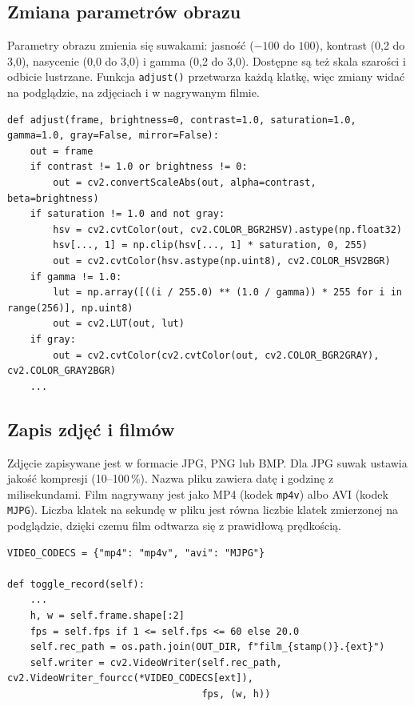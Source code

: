 \subsection{Zmiana parametrów obrazu}
Parametry obrazu zmienia się suwakami: jasność ($-100$ do $100$), kontrast (0,2 do 3,0),
nasycenie (0,0 do 3,0) i gamma (0,2 do 3,0). Dostępne są też skala szarości i odbicie lustrzane.
Funkcja \texttt{adjust()} przetwarza każdą klatkę, więc zmiany widać na podglądzie, na zdjęciach
i w nagrywanym filmie.
\begin{lstlisting}
def adjust(frame, brightness=0, contrast=1.0, saturation=1.0, gamma=1.0, gray=False, mirror=False):
    out = frame
    if contrast != 1.0 or brightness != 0:
        out = cv2.convertScaleAbs(out, alpha=contrast, beta=brightness)
    if saturation != 1.0 and not gray:
        hsv = cv2.cvtColor(out, cv2.COLOR_BGR2HSV).astype(np.float32)
        hsv[..., 1] = np.clip(hsv[..., 1] * saturation, 0, 255)
        out = cv2.cvtColor(hsv.astype(np.uint8), cv2.COLOR_HSV2BGR)
    if gamma != 1.0:
        lut = np.array([((i / 255.0) ** (1.0 / gamma)) * 255 for i in range(256)], np.uint8)
        out = cv2.LUT(out, lut)
    if gray:
        out = cv2.cvtColor(cv2.cvtColor(out, cv2.COLOR_BGR2GRAY), cv2.COLOR_GRAY2BGR)
    ...
\end{lstlisting}

\subsection{Zapis zdjęć i filmów}
Zdjęcie zapisywane jest w formacie JPG, PNG lub BMP. Dla JPG suwak ustawia jakość kompresji
(10–100\,\%). Nazwa pliku zawiera datę i godzinę z milisekundami. Film nagrywany jest jako MP4
(kodek \texttt{mp4v}) albo AVI (kodek \texttt{MJPG}). Liczba klatek na sekundę w pliku jest równa
liczbie klatek zmierzonej na podglądzie, dzięki czemu film odtwarza się z prawidłową prędkością.
\begin{lstlisting}
VIDEO_CODECS = {"mp4": "mp4v", "avi": "MJPG"}

def toggle_record(self):
    ...
    h, w = self.frame.shape[:2]
    fps = self.fps if 1 <= self.fps <= 60 else 20.0
    self.rec_path = os.path.join(OUT_DIR, f"film_{stamp()}.{ext}")
    self.writer = cv2.VideoWriter(self.rec_path, cv2.VideoWriter_fourcc(*VIDEO_CODECS[ext]),
                                  fps, (w, h))
\end{lstlisting}

